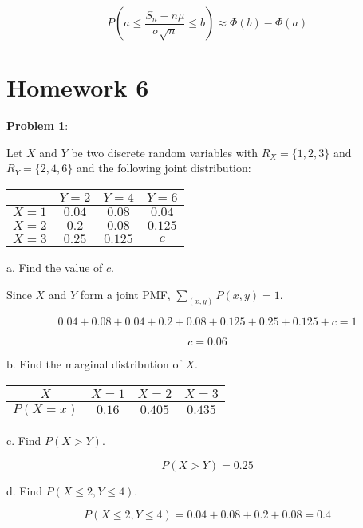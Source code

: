 \documentclass{article}
\begin{document}
$$P(a\le\frac{S_n-n\mu}{\sigma\sqrt{n}}\le b)\approx\Phi(b)-\Phi(a)$$

\section{Homework 6}

\noindent\textbf{Problem 1}:

Let $X$ and $Y$ be two discrete random variables with $R_X=\{1,2,3\}$ and $R_Y=\{2,4,6\}$ and the following joint distribution:

\begin{center}
    \begin{tabular}{ | c | c | c | c | }
        \hline
        &$Y=2$ & $Y=4$ & $Y=6$ \\ 
        \hline
        $X=1$&$0.04$&$0.08$&$0.04$\\
        \hline
        $X=2$&$0.2$&$0.08$&$0.125$\\
        \hline
        $X=3$&$0.25$&$0.125$&$c$\\
        \hline
    \end{tabular}
\end{center}

\indent a. Find the value of $c$.

{\color{blue}

Since $X$ and $Y$ form a joint PMF, $\underset{(x,y)}{\sum}P(x,y)=1$. 

$$0.04+0.08+0.04+0.2+0.08+0.125+0.25+0.125+c=1$$

$$c=0.06$$
}

\indent b. Find the marginal distribution of $X$.

{\color{blue}

\begin{center}
    \begin{tabular}{ |c|c|c|c| }
        \hline
        $X$&$X=1$ & $X=2$ & $X=3$ \\ 
        \hline
        $P(X=x)$&$0.16$&$0.405$&$0.435$\\
        \hline
    \end{tabular}
\end{center}

}

\indent c. Find $P(X>Y)$.

{\color{blue}

$$P(X>Y)=0.25$$

}

\indent d. Find $P(X\le2,Y\le4)$.

{\color{blue}

$$P(X\le2,Y\le4)=0.04+0.08+0.2+0.08=0.4$$

}
\end{document}
